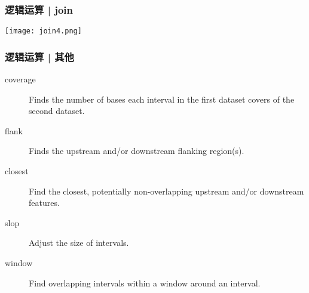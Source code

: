 \begin{frame}
  \frametitle{逻辑运算 | join}
    \begin{center}
      \texttt{[image: join4.png]}
    \end{center}
\end{frame}

\begin{frame}
  \frametitle{逻辑运算 | 其他}
  \begin{description}
    \item[coverage] Finds the number of bases each interval in the first dataset covers of the second dataset.
    \item[flank] Finds the upstream and/or downstream flanking region(s).
    \item[closest] Find the closest, potentially non-overlapping upstream and/or downstream features.
    \item[slop] Adjust the size of intervals.
    \item[window] Find overlapping intervals within a window around an interval.
  \end{description}
\end{frame}

